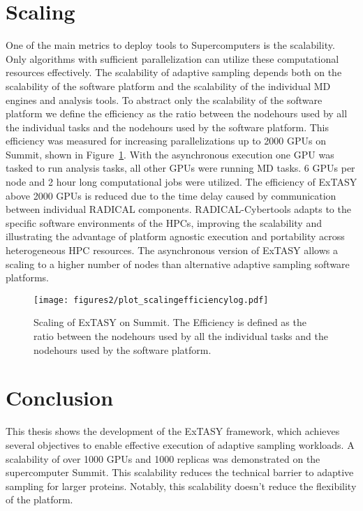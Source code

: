 {\section{\label{sec:scaling} Scaling}


One of the main metrics to deploy tools to Supercomputers is the scalability. Only algorithms with sufficient parallelization can utilize these computational resources effectively. The scalability of adaptive sampling depends both on the scalability of the software platform and the scalability of the individual MD engines and analysis tools. To abstract only the scalability of the software platform we define the efficiency as the ratio between the nodehours used by all the individual tasks and the nodehours used by the software platform. 
This efficiency was measured for increasing parallelizations up to 2000 GPUs on Summit, shown in Figure~\ref{fig:scaling}. With the asynchronous execution one GPU was tasked to run analysis tasks, all other GPUs were running MD tasks. 6 GPUs per node and 2 hour long computational jobs were utilized. The efficiency of ExTASY above 2000 GPUs is reduced due to the time delay caused by communication between individual RADICAL components. RADICAL-Cybertools adapts to the specific software environments of the HPCs\cite{turilli2019ac}, improving the scalability and illustrating the advantage of platform agnostic execution and portability across
heterogeneous HPC resources. The asynchronous version of ExTASY allows a scaling to a higher number of nodes than alternative adaptive sampling software platforms.

\begin{figure}[H]
  \centering
  \texttt{[image: figures2/plot\_scalingefficiencylog.pdf]}
  \caption{Scaling of ExTASY on Summit. The Efficiency is defined as the ratio between the nodehours used by all the individual tasks and the nodehours used by the software platform. }
  \label{fig:scaling}
\end{figure}



\section{\label{sec:conclusion}Conclusion}
This thesis shows the development of the ExTASY framework, which achieves several objectives to enable effective execution of adaptive sampling workloads. A scalability of over 1000 GPUs and 1000 replicas was demonstrated on the supercomputer Summit. This scalability reduces the technical barrier to adaptive sampling for larger proteins. Notably, this scalability doesn't reduce the flexibility of the platform.

}

